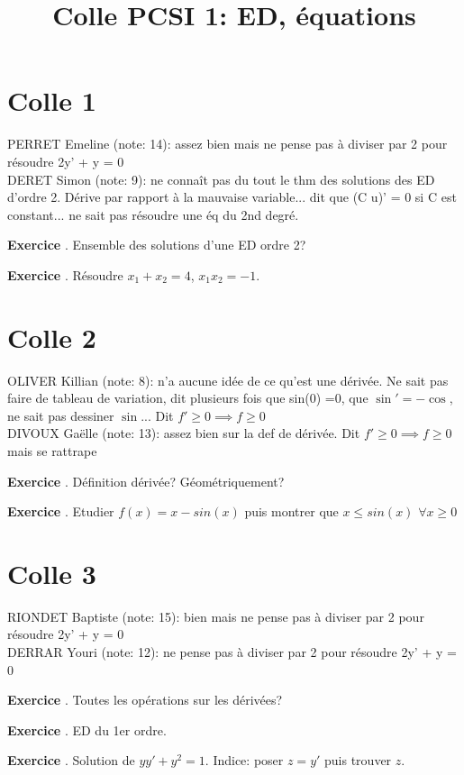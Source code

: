 \documentclass[10pt,a4paper]{article}
\title{Colle PCSI 1: ED, équations}
\newcounter{question}
\newcounter{exo}
\newenvironment{exo}{\vspace{0.5cm}\setcounter{question}{0}\addtocounter{exo}{1} \noindent \textbf{Exercice \theexo}. \normalsize }{\par}
\begin{document}
	\maketitle
	
	\section*{Colle 1}
	PERRET Emeline (note: 14): assez bien mais ne pense pas à diviser par 2 pour résoudre 2y' + y = 0\\
	DERET Simon (note: 9): ne connaît pas du tout le thm des solutions des ED d'ordre 2. Dérive par rapport à la mauvaise variable... dit que (C u)' = 0 si C est constant... ne sait pas résoudre une éq du 2nd degré.
	
	\begin{exo}
		Ensemble des solutions d'une ED ordre 2?
	\end{exo}
	\begin{exo}
		Résoudre $x_1 + x_2 =4$, $x_1 x_2 = -1$.
	\end{exo}
	
	\section*{Colle 2}
	\setcounter{exo}{0}
	OLIVER Killian (note: 8): n'a aucune idée de ce qu'est une dérivée. Ne sait pas faire de tableau de variation, dit plusieurs fois que sin(0) =0, que $\sin' = - \cos$, ne sait pas dessiner $\sin$... Dit $f' \geq 0 \implies f \geq 0$\\
	DIVOUX Gaëlle (note: 13): assez bien sur la def de dérivée. Dit $f' \geq 0 \implies f \geq 0$ mais se rattrape
	
	\begin{exo}
		Définition dérivée? Géométriquement?
	\end{exo}

	\begin{exo}
		Etudier $f(x) = x - sin(x)$ puis montrer que $x \leq sin(x)$ $\forall x \geq 0$
	\end{exo}	
	
	\section*{Colle 3}
	\setcounter{exo}{0}
	RIONDET Baptiste (note: 15): bien mais ne pense pas à diviser par 2 pour résoudre 2y' + y = 0\\
	DERRAR Youri (note: 12): ne pense pas à diviser par 2 pour résoudre 2y' + y = 0
	
	\begin{exo}
		Toutes les opérations sur les dérivées?
	\end{exo}

	\begin{exo}
		ED du 1er ordre.
	\end{exo}	
	
	\begin{exo}
		Solution de $yy' + y^2 = 1$. Indice: poser $z = y'$ puis trouver $z$.
	\end{exo}	
	 
\end{document}

